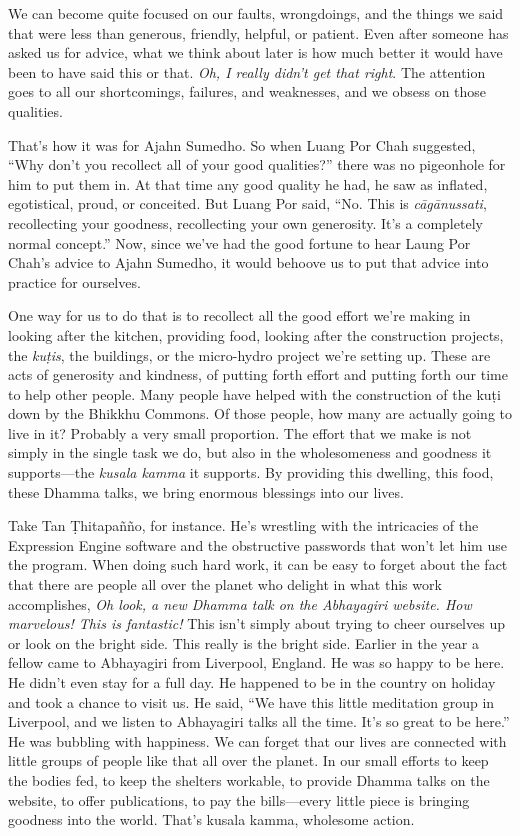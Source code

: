 We can become quite focused on our faults, wrongdoings, and the things 
we said that were less than generous, friendly, helpful, or patient. 
Even after someone has asked us for advice, what we think about later 
is how much better it would have been to have said this or that. 
\emph{Oh, I really didn't get that right}. The attention goes to all 
our shortcomings, failures, and weaknesses, and we obsess on those 
qualities.

That's how it was for Ajahn Sumedho. So when Luang Por Chah suggested, 
``Why don't you recollect all of your good qualities?'' there was no 
pigeonhole for him to put them in. At that time any good quality he 
had, he saw as inflated, egotistical, proud, or conceited. But Luang 
Por said, ``No. This is \emph{cāgānussati}, recollecting your 
goodness, recollecting your own generosity. It's a completely normal 
concept.'' Now, since we've had the good fortune to hear Laung Por 
Chah's advice to Ajahn Sumedho, it would behoove us to put that advice 
into practice for ourselves.

One way for us to do that is to recollect all the good effort we're 
making in looking after the kitchen, providing food, looking after the 
construction projects, the \emph{kuṭis}, the buildings, or the 
micro-hydro project we're setting up. These are acts of generosity and 
kindness, of putting forth effort and putting forth our time to help 
other people. Many people have helped with the construction of the 
kuṭi down by the Bhikkhu Commons. Of those people, how many are 
actually going to live in it? Probably a very small proportion. The 
effort that we make is not simply in the single task we do, but also in 
the wholesomeness and goodness it supports---the \emph{kusala kamma} it 
supports. By providing this dwelling, this food, these Dhamma talks, we 
bring enormous blessings into our lives.

Take Tan Ṭhitapañño, for instance. He's wrestling with the 
intricacies of the Expression Engine software and the obstructive 
passwords that won't let him use the program. When doing such hard 
work, it can be easy to forget about the fact that there are people all 
over the planet who delight in what this work accomplishes, \emph{Oh 
look, a new Dhamma talk on the Abhayagiri website. How marvelous! This 
is fantastic!} This isn't simply about trying to cheer ourselves up or 
look on the bright side. This really is the bright side. Earlier in the 
year a fellow came to Abhayagiri from Liverpool, England. He was so 
happy to be here. He didn't even stay for a full day. He happened to be 
in the country on holiday and took a chance to visit us. He said, ``We 
have this little meditation group in Liverpool, and we listen to 
Abhayagiri talks all the time. It's so great to be here.'' He was 
bubbling with happiness. We can forget that our lives are connected 
with little groups of people like that all over the planet. In our 
small efforts to keep the bodies fed, to keep the shelters workable, to 
provide Dhamma talks on the website, to offer publications, to pay the 
bills---every little piece is bringing goodness into the world. That's 
kusala kamma, wholesome action.

